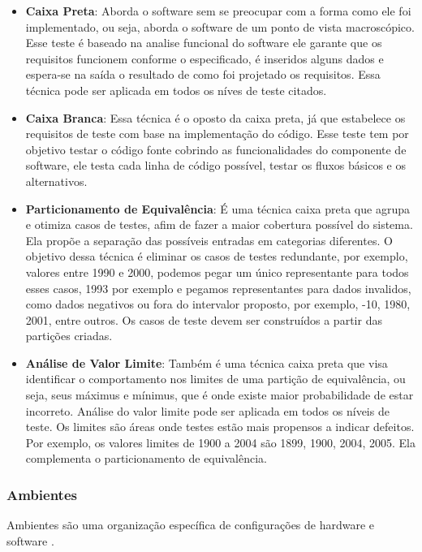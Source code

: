 \begin{itemize}
  \item \textbf{Caixa Preta}: Aborda o software sem se preocupar com a forma como ele foi implementado, ou seja, aborda o software de um ponto de vista macroscópico. Esse teste é baseado na analise funcional do software ele garante que os requisitos funcionem conforme o especificado, é inseridos alguns dados e espera-se na saída o resultado de como foi projetado os requisitos. Essa técnica pode ser aplicada em todos os níves de teste citados.
  \item \textbf{Caixa Branca}: Essa técnica é o oposto da caixa preta, já que estabelece os requisitos de teste com base na implementação do código. Esse teste tem por objetivo testar o código fonte cobrindo as funcionalidades do componente de software, ele testa cada linha de código possível, testar os fluxos básicos e os alternativos.
  \item \textbf{Particionamento de Equivalência}: É uma técnica caixa preta que agrupa e otimiza casos de testes, afim de fazer a maior cobertura possível do sistema. Ela propõe a separação das possíveis entradas em categorias diferentes. O objetivo dessa técnica é eliminar os casos de testes redundante, por exemplo, valores entre 1990 e 2000, podemos pegar um único representante para todos esses casos, 1993 por exemplo e pegamos representantes para dados invalidos, como dados negativos ou fora do intervalor proposto, por exemplo, -10, 1980, 2001, entre outros. Os casos de teste devem ser construídos a partir das partições criadas.
  \item \textbf{Análise de Valor Limite}: Também é uma técnica caixa preta que visa identificar o comportamento nos limites de uma partição de equivalência, ou seja, seus máximus e mínimus, que é onde existe maior probabilidade de estar incorreto. Análise do valor limite pode ser aplicada em todos os níveis de teste. Os limites são áreas onde testes estão mais propensos a indicar defeitos. Por exemplo, os valores limites de 1900 a 2004 são 1899, 1900, 2004, 2005. Ela complementa o particionamento de equivalência.
\end{itemize}

\subsubsection{Ambientes}

Ambientes são uma organização específica de configurações de hardware e software \cite{myers}.

